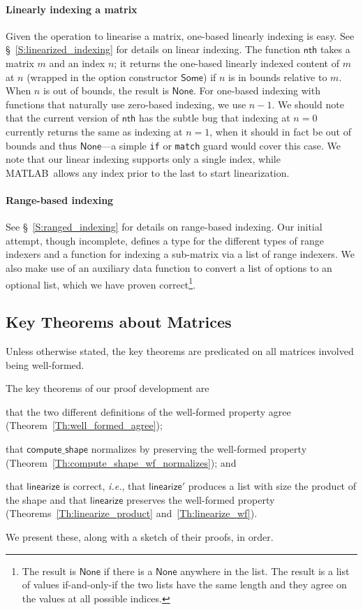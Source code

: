 \documentclass[11pt,conference]{IEEEtran}
\newcommand{\matlab}{MATLAB}
\newcommand{\func}[1]{\mathsf{#1}}
\theoremstyle{plain} %
\theoremstyle{definition}
\theoremstyle{remark}
\begin{document}
\paragraph{Linearly indexing a matrix} Given the operation to linearise a
matrix, one-based linearly indexing is easy. See \S~\ref{S:linearized_indexing}
for details on linear indexing. The function \(\func{nth}\) takes a matrix \(m\)
and an index \(n\); it returns the one-based linearly indexed content of \(m\)
at \(n\) (wrapped in the option constructor \(\func{Some}\)) if \(n\) is in
bounds relative to \(m\). When \(n\) is out of bounds, the result is
\(\func{None}\). For one-based indexing with functions that naturally use
zero-based indexing, we use \(n-1\). We should note that the current version of
\(\func{nth}\) has the subtle bug that indexing at \(n=0\) currently returns the
same as indexing at \(n=1\), when it should in fact be out of bounds and thus
\(\func{None}\)---a simple \texttt{if} or \texttt{match} guard would cover this
case. We note that our linear indexing supports only a single index, while
\matlab\ allows any index prior to the last to start linearization.

\paragraph{Range-based indexing} See \S~\ref{S:ranged_indexing} for details on
range-based indexing. Our initial attempt, though incomplete, defines a type for
the different types of range indexers and a function for indexing a sub-matrix
via a list of range indexers. We also make use of an auxiliary data function to
convert a list of options to an optional list, which we have proven
correct\footnote{The result is \(\func{None}\) if there is a \(\func{None}\)
anywhere in the list. The result is a list of values if-and-only-if the two
lists have the same length and they agree on the values at all possible
indices.}.

\subsection{Key Theorems about Matrices}\label{S:matrix_thm}

Unless otherwise stated, the key theorems are predicated on all matrices
involved being well-formed.

The key theorems of our proof development are
\begin{inlist}
\item that the two different definitions of the well-formed property agree
    (Theorem~\ref{Th:well_formed_agree});
\item that \(\func{compute\_shape}\) normalizes by preserving the well-formed
    property (Theorem~\ref{Th:compute_shape_wf_normalizes}); and
\item that \(\func{linearize}\) is correct, \textit{i.e.}, that
    \(\func{linearize'}\) produces a list with size the product of the shape and
    that \(\func{linearize}\) preserves the well-formed property
    (Theorems~\ref{Th:linearize_product} and~\ref{Th:linearize_wf}).
\end{inlist}
We present these, along with a sketch of their proofs, in order.
\end{document}
